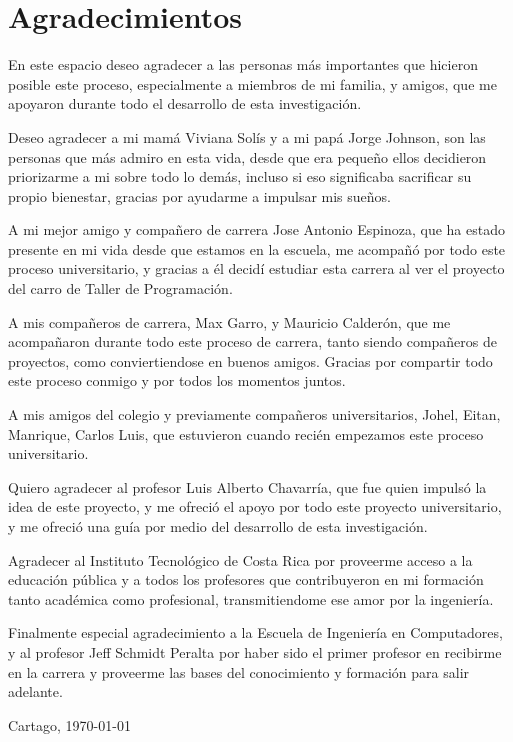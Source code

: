 \chapter*{Agradecimientos}
\thispagestyle{empty}

En este espacio deseo agradecer a las personas más importantes que hicieron posible este proceso, especialmente a miembros de mi familia, y amigos, que me apoyaron durante todo el desarrollo de esta investigación.

Deseo agradecer a mi mamá Viviana Solís y a mi papá Jorge Johnson, son las personas que más admiro en esta vida, desde que era pequeño ellos decidieron priorizarme a mi sobre todo lo demás, incluso si eso significaba sacrificar su propio bienestar, gracias por ayudarme a impulsar mis sueños. 

A mi mejor amigo y compañero de carrera Jose Antonio Espinoza, que ha estado presente en mi vida desde que estamos en la escuela, me acompañó por todo este proceso universitario, y gracias a él decidí estudiar esta carrera al ver el proyecto del carro de Taller de Programación. 

A mis compañeros de carrera, Max Garro, y Mauricio Calderón, que me acompañaron durante todo este proceso de carrera, tanto siendo compañeros de proyectos, como conviertiendose en buenos amigos. Gracias por compartir todo este proceso conmigo y por todos los momentos juntos.

A mis amigos del colegio y previamente compañeros universitarios, Johel, Eitan, Manrique, Carlos Luis, que estuvieron cuando recién empezamos este proceso universitario. 

Quiero agradecer al profesor Luis Alberto Chavarría, que fue quien impulsó la idea de este proyecto, y me ofreció el apoyo por todo este proyecto universitario, y me ofreció una guía por medio del desarrollo de esta investigación.

Agradecer al Instituto Tecnológico de Costa Rica por proveerme acceso a la educación pública y a todos los profesores que contribuyeron en mi formación tanto académica como profesional, transmitiendome ese amor por la ingeniería. 

Finalmente especial agradecimiento a la Escuela de Ingeniería en Computadores, y al profesor Jeff Schmidt Peralta por haber sido el primer profesor en recibirme en la carrera y proveerme las bases del conocimiento y formación para salir adelante.



\vspace*{1cm}

\scriptAuthor

Cartago, \today

\cleardoublepage

